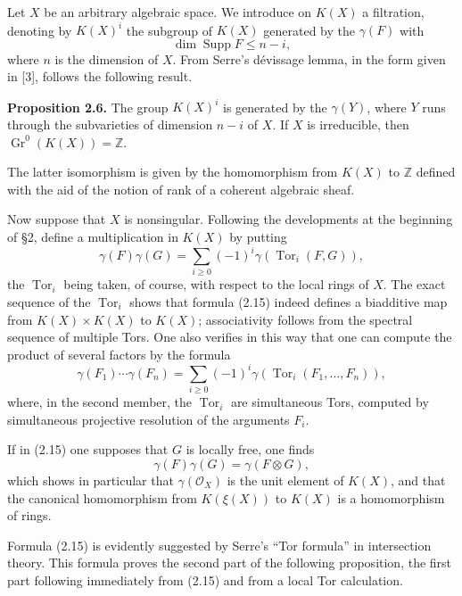 \documentclass[11pt]{article}
\newcommand{\Gr}{\operatorname{Gr}}
\newcommand{\Tor}{\operatorname{Tor}}
\providecommand{\Z}{\mathbb Z}
\providecommand{\Gr}{\operatorname{Gr}}
\providecommand{\Tor}{\operatorname{Tor}}
\providecommand{\Supp}{\operatorname{Supp}}
\providecommand{\Gr}{\operatorname{G}}
\providecommand{\cO}{\mathcal O}
\begin{document}
Let $X$ be an arbitrary algebraic space. We introduce on $K(X)$ a filtration, denoting by $K(X)^i$ the subgroup of $K(X)$ generated by the $\gamma(F)$ with
\[
 \dim \Supp F\leq n-i,
\]
where $n$ is the dimension of $X$. From Serre's d\'evissage lemma, in the form given in [3], follows the following result.

\textbf{Proposition 2.6.} The group $K(X)^i$ is generated by the $\gamma(Y)$, where $Y$ runs through the subvarieties of dimension $n-i$ of $X$. If $X$ is irreducible, then $\Gr^0(K(X))=\Z$.

The latter isomorphism is given by the homomorphism from $K(X)$ to $\Z$ defined with the aid of the notion of rank of a coherent algebraic sheaf.

Now suppose that $X$ is nonsingular. Following the developments at the beginning of \S 2, define a multiplication in $K(X)$ by putting
\begin{equation}\tag{2.15}
 \gamma(F)\gamma(G)=\sum_{i\geq 0}(-1)^i\gamma(\Tor_i(F,G)),
\end{equation}
the $\Tor_i$ being taken, of course, with respect to the local rings of $X$. The exact sequence of the $\Tor_i$ shows that formula (2.15) indeed defines a biadditive map from $K(X)\times K(X)$ to $K(X)$; associativity follows from the spectral sequence of multiple Tors. One also verifies in this way that one can compute the product of several factors by the formula
\begin{equation}\tag{2.16}
 \gamma(F_1)\cdots\gamma(F_n)=\sum_{i\geq 0}(-1)^i\gamma(\Tor_i(F_1,\ldots,F_n)),
\end{equation}
where, in the second member, the $\Tor_i$ are simultaneous Tors, computed by simultaneous projective resolution of the arguments $F_i$.

If in (2.15) one supposes that $G$ is locally free, one finds
\begin{equation}\tag{2.15 bis}
 \gamma(F)\gamma(G)=\gamma(F\otimes G),
\end{equation}
which shows in particular that $\gamma(\cO_X)$ is the unit element of $K(X)$, and that the canonical homomorphism from $K(\xi(X))$ to $K(X)$ is a homomorphism of rings.

Formula (2.15) is evidently suggested by Serre's ``Tor formula'' in intersection theory. This formula proves the second part of the following proposition, the first part following immediately from (2.15) and from a local Tor calculation.
\end{document}
